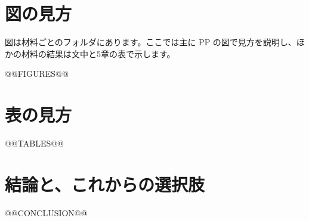 \documentclass[paper=a4paper,fontsize=10.5pt,line_length=44zw,number_of_lines=38]{jlreq}
\begin{document}
\section{図の見方}

図は材料ごとのフォルダにあります。ここでは主に PP の図で見方を説明し、ほかの材料の結果は文中と5章の表で示します。

@@FIGURES@@

\section{表の見方}

@@TABLES@@

\section{結論と、これからの選択肢}

@@CONCLUSION@@
\end{document}
